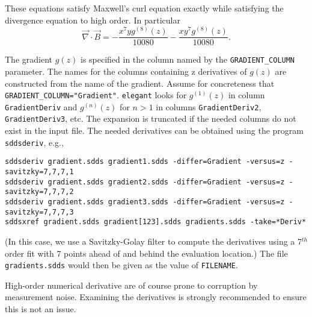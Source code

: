 These equations satisfy Maxwell's curl equation exactly while satisfying the divergence equation to high order.
In particular
\begin{equation}
\vec{\nabla} \cdot \vec{B} = -\frac{x^7 y g^{(8)}(z)}{10080}-\frac{x y^7 g^{(8)}(z)}{10080}.
\end{equation}

The gradient $g(z)$ is specified in the column named by the \verb|GRADIENT_COLUMN| parameter.
The names for the columns containing z derivatives of $g(z)$ are constructed from the name of the gradient.
Assume for concreteness that \verb|GRADIENT_COLUMN="Gradient"|. 
{\tt elegant} looks for $g^{(1)}(z)$ in column \verb|GradientDeriv| and 
$g^{(n)}(z)$ for $n>1$ in columns \verb|GradientDeriv2|, \verb|GradientDeriv3|,  etc.
The expansion is truncated if the needed columns do not exist in the input file.
The needed derivatives can be obtained using the program \verb|sddsderiv|, e.g.,
\begin{verbatim}
sddsderiv gradient.sdds gradient1.sdds -differ=Gradient -versus=z -savitzky=7,7,7,1
sddsderiv gradient.sdds gradient2.sdds -differ=Gradient -versus=z -savitzky=7,7,7,2
sddsderiv gradient.sdds gradient3.sdds -differ=Gradient -versus=z -savitzky=7,7,7,3
sddsxref gradient.sdds gradient[123].sdds gradients.sdds -take=*Deriv* 
\end{verbatim}
(In this case, we use a Savitzky-Golay filter to compute the derivatives using a 7$^{th}$ order
fit with 7 points ahead of and behind the evaluation location.)
The file \verb|gradients.sdds| would then be given as the value of \verb|FILENAME|.

High-order numerical derivative are of course prone to corruption by measurement noise. 
Examining the derivatives is strongly recommended to ensure this is not an issue.
